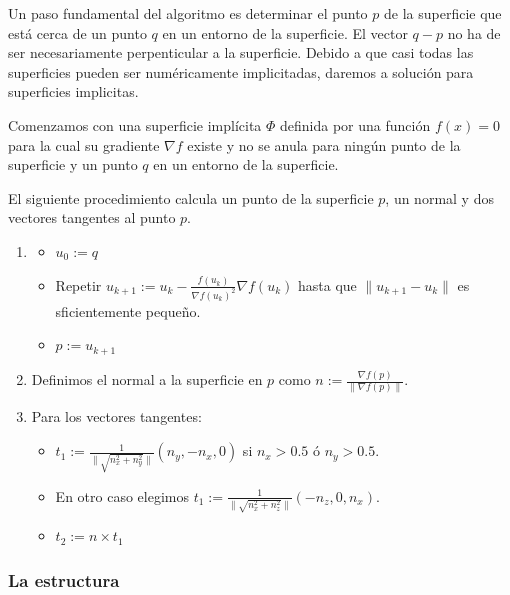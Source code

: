 Un paso fundamental del algoritmo es determinar el punto $p$ de la superficie que está cerca de un punto $q$ en un entorno de la superficie. El vector $q - p$ no ha de ser necesariamente perpenticular a la superficie. Debido a que casi todas las superficies pueden ser numéricamente implicitadas, daremos a solución para superficies implicitas.
\par Comenzamos con una superficie implícita $\Phi$ definida por una función $f(x) = 0$ para la cual su gradiente $\nabla f$ existe y no se anula para ningún punto de la superficie y un punto $q$ en un entorno de la superficie.
\par El siguiente procedimiento calcula un punto de la superficie $p$, un normal y dos vectores tangentes al punto $p$.

\begin{enumerate}
	\item \begin{itemize}
		\item $u_0 := q$
		\item Repetir $u_{k+1} := u_k - \frac{f(u_k)}{\nabla f(u_k)^2} \nabla f(u_k)$ hasta que $\| u_{k+1} - u_k \|$ es sficientemente pequeño.
		\item $p := u_{k+1}$ 
\end{itemize}		
	\item Definimos el normal a la superficie en $p$ como $n := \frac{\nabla f(p)}{\| \nabla f(p) \|}$.
	\item Para los vectores tangentes: \begin{itemize}
		\item $t_1 := \frac{1}{\| \sqrt{n_x^2 + n_y^2} \|} (n_y, -n_x, 0)$ si $n_x > 0.5$ ó $n_y > 0.5$.
		\item En otro caso elegimos $t_1 := \frac{1}{\| \sqrt{n_x^2 + n_z^2} \|} (-n_z, 0, n_x)$.
		\item $t_2 := n \times t_1$
	\end{itemize}
\end{enumerate}

\subsubsection{La estructura}

